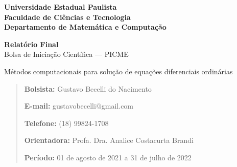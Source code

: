 \begin{center}
	{\bf Universidade Estadual Paulista\\
		Faculdade de Ciências e Tecnologia \\
	Departamento de Matemática e Computação}
\end{center}

\vspace{3cm} \begin{center}
{\bf Relatório Final}\\
Bolsa de Iniciação Científica --- PICME
\end{center}

\vspace{4cm}

{\Large\bf \noindent \begin{center} Métodos computacionais para solução de equações diferenciais ordinárias
	\end{center} }

\vspace{6cm}
\begin{quote}
	{\bf Bolsista:} Gustavo Becelli do Nacimento

	{\bf E-mail:} gustavobecelli@gmail.com

	{\bf Telefone:} (18) 99824-1708

	{\bf Orientadora:} Profa. Dra. Analice Costacurta Brandi

	{\bf Período:} 01 de agosto de 2021 a 31 de julho de 2022
\end{quote}

